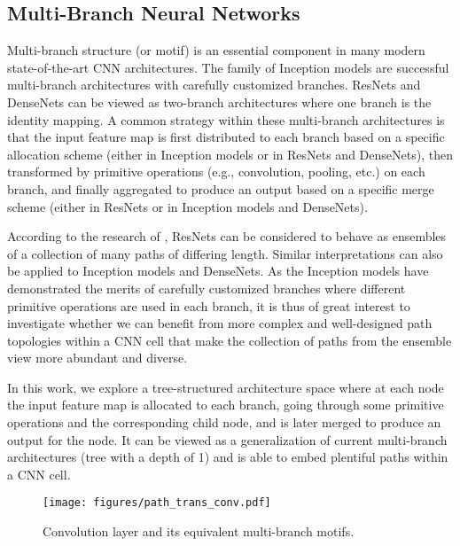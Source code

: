 \documentclass{article}
\begin{document}
\subsection{Multi-Branch Neural Networks}\label{sec:multi_branch}
Multi-branch structure (or motif) is an essential component in many modern state-of-the-art CNN architectures. The family of Inception models \cite{szegedy2015going,szegedy2017inception,szegedy2016rethinking} are successful multi-branch architectures with carefully customized branches.  
ResNets \cite{he2016deep} and DenseNets \cite{huang2016densely} can be viewed as two-branch architectures where one branch is the identity mapping. 
A common strategy within these multi-branch architectures is that the input feature map  is first distributed to each branch based on a specific allocation scheme (either  in Inception models or  in ResNets and DenseNets), then transformed by primitive operations (e.g., convolution, pooling, etc.) on each branch, and finally aggregated to produce an output based on a specific merge scheme (either  in ResNets or  in Inception models and DenseNets).


According to the research of \citet{veit2016residual}, ResNets can be considered to behave as ensembles of a collection of many paths of differing length. Similar interpretations can also be applied to Inception models and DenseNets. As the Inception models have demonstrated the merits of carefully customized branches where different primitive operations are used in each branch, it is thus of great interest to investigate whether we can benefit from more complex and well-designed path topologies within a CNN cell that make the collection of paths from the ensemble view more abundant and diverse.

In this work, we explore a tree-structured architecture space where at each node the input feature map is allocated to each branch, going through some primitive operations and the corresponding child node, and is later merged to produce an output for the node. It can be viewed as a generalization of current multi-branch architectures (tree with a depth of 1) and is able to embed plentiful paths within a CNN cell. 

\begin{figure}[t]
	\centering
	\texttt{[image: figures/path\_trans\_conv.pdf]}
	\caption{Convolution layer and its equivalent multi-branch motifs.}
	\label{fig:path_trans_conv}
\end{figure}
\end{document}
